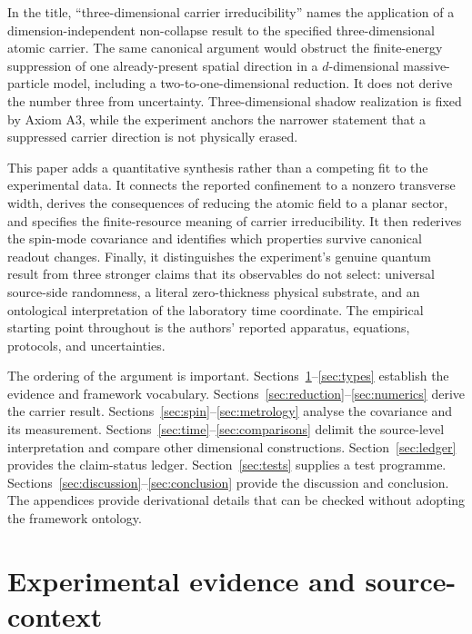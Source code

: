 \documentclass[11pt,a4paper]{article}
\theoremstyle{definition}
\theoremstyle{remark}
\begin{document}
In the title, ``three-dimensional carrier irreducibility'' names the application of a dimension-independent non-collapse result to the specified three-dimensional atomic carrier. The same canonical argument would obstruct the finite-energy suppression of one already-present spatial direction in a $d$-dimensional massive-particle model, including a two-to-one-dimensional reduction. It does not derive the number three from uncertainty. Three-dimensional shadow realization is fixed by Axiom A3, while the experiment anchors the narrower statement that a suppressed carrier direction is not physically erased.\cite{foundation}

This paper adds a quantitative synthesis rather than a competing fit to the experimental data. It connects the reported confinement to a nonzero transverse width, derives the consequences of reducing the atomic field to a planar sector, and specifies the finite-resource meaning of carrier irreducibility. It then rederives the spin-mode covariance and identifies which properties survive canonical readout changes. Finally, it distinguishes the experiment's genuine quantum result from three stronger claims that its observables do not select: universal source-side randomness, a literal zero-thickness physical substrate, and an ontological interpretation of the laboratory time coordinate. The empirical starting point throughout is the authors' reported apparatus, equations, protocols, and uncertainties.\cite{zhang2026}

The ordering of the argument is important. Sections~\ref{sec:evidence}--\ref{sec:types} establish the evidence and framework vocabulary. Sections~\ref{sec:reduction}--\ref{sec:numerics} derive the carrier result. Sections~\ref{sec:spin}--\ref{sec:metrology} analyse the covariance and its measurement. Sections~\ref{sec:time}--\ref{sec:comparisons} delimit the source-level interpretation and compare other dimensional constructions. Section~\ref{sec:ledger} provides the claim-status ledger. Section~\ref{sec:tests} supplies a test programme. Sections~\ref{sec:discussion}--\ref{sec:conclusion} provide the discussion and conclusion. The appendices provide derivational details that can be checked without adopting the framework ontology.

\section{Experimental evidence and source-context}
\label{sec:evidence}
\end{document}
